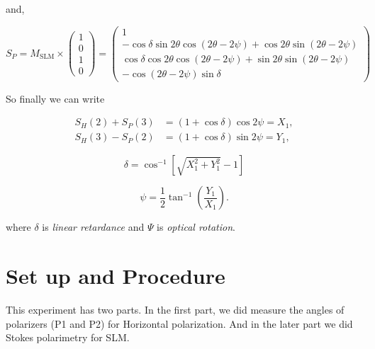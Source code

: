 and, 

\begin{equation} \label{eq:Stokes_SP}
        S_P = M_{\mathrm{SLM}} \times \begin{pmatrix}1\\[2pt]0\\[2pt]1\\[2pt]0\end{pmatrix} = \begin{pmatrix}
        1 \\
        -\cos\delta \sin 2\theta \cos(2\theta-2\psi)
        + \cos 2\theta \sin(2\theta-2\psi) \\
        \cos\delta \cos 2\theta \cos(2\theta-2\psi)
        + \sin 2\theta \sin(2\theta-2\psi) \\
        -\cos(2\theta-2\psi)\sin\delta
        \end{pmatrix}
\end{equation}

So finally we can write 

\begin{subequations}\label{eq:stokes_X_Y}
    \begin{align}
    S_H(2) + S_P(3) &= (1+\cos\delta)\cos 2\psi = X_1, \\
    S_H(3) - S_P(2) &= (1+\cos\delta)\sin 2\psi = Y_1,
    \end{align}
\end{subequations}

\begin{equation}\label{eq:delta}
\boxed{\delta = \cos^{-1}\!\left[\sqrt{X_1^{2}+Y_1^{2}} - 1 \right]}
\end{equation}

\begin{equation}\label{eq:psi}
\boxed{\psi = \frac{1}{2}\tan^{-1}\!\left(\frac{Y_1}{X_1}\right)}.
\end{equation}

where $\delta$ is \emph{linear retardance} and $\Psi$ is \emph{optical rotation}.
\section{Set up and Procedure}
This experiment has two parts. In the first part, we did measure the angles of polarizers (P1 and P2) for Horizontal polarization. And in the later part we did Stokes polarimetry for SLM. 
